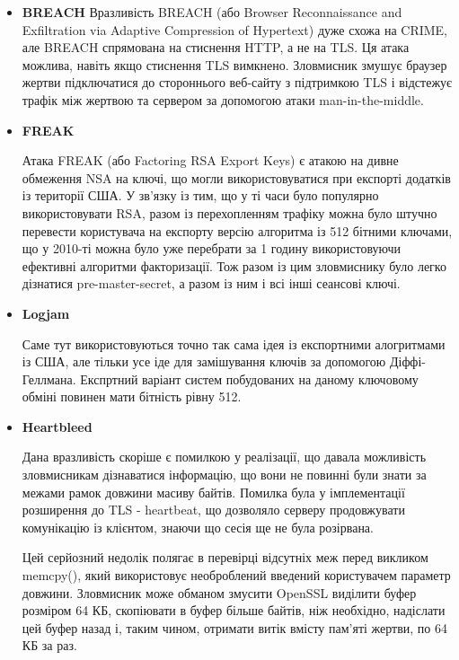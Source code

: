 \begin{itemize}
    
    \item \textbf{BREACH}
    Вразливість BREACH (або Browser Reconnaissance and Exfiltration via Adaptive Compression of Hypertext) дуже схожа на CRIME, але BREACH спрямована на стиснення HTTP, а не на TLS. Ця атака можлива, навіть якщо стиснення TLS вимкнено. Зловмисник змушує браузер жертви підключатися до стороннього веб-сайту з підтримкою TLS і відстежує трафік між жертвою та сервером за допомогою атаки man-in-the-middle.

    
    \item \textbf{FREAK}

    Атака FREAK (або Factoring RSA Export Keys) є атакою на дивне обмеження NSA на ключі, що могли використовуватися при експорті додатків із території США. У зв'язку із тим, що у ті часи було популярно використовувати RSA, разом із перехопленням трафіку можна було штучно перевести користувача на експорту версію алгоритма із 512 бітними ключами, що у 2010-ті можна було уже перебрати за 1 годину використовуючи ефективні алгоритми факторизації. Тож разом із цим зловмиснику було легко дізнатися pre-master-secret, а разом із ним і всі інші сеансові ключі.
    
    \item \textbf{Logjam}

    Саме тут використовуються точно так сама ідея із експортними алогритмами із США, але тільки усе іде для замішування ключів за допомогою Діффі-Геллмана. Експртний варіант систем побудованих на даному ключовому обміні повинен мати бітність рівну 512.
    
    
    \item \textbf{Heartbleed}

    Дана вразливість скоріше є помилкою у реалізації, що давала можливість зловмисникам дізнаватися інформацію, що вони не повинні були знати за межами рамок довжини масиву байтів. Помилка була у імплементації розширення до TLS - heartbeat, що дозволяло серверу продовжувати комунікацію із клієнтом, знаючи що сесія ще не була розірвана. 

    
    Цей серйозний недолік полягає в перевірці відсутніх меж перед викликом memcpy(), який використовує необроблений введений користувачем параметр довжини. Зловмисник може обманом змусити OpenSSL виділити буфер розміром 64 КБ, скопіювати в буфер більше байтів, ніж необхідно, надіслати цей буфер назад і, таким чином, отримати витік вмісту пам’яті жертви, по 64 КБ за раз.

        
    

\end{itemize}
